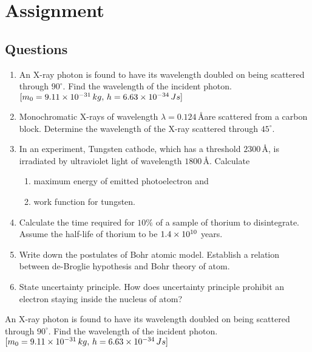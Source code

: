 \documentclass[../main.tex]{subfiles}
\begin{document}
\chapter{Assignment}
\section{Questions}
\begin{enumerate}
    \item An X-ray photon is found to have its wavelength doubled on being scattered through $ 90^\circ $. Find the wavelength of the incident photon. $ [m_0=9.11\times 10^{-31} \,kg,\, h= 6.63\times 10^{-34} \,Js] $
    \item Monochromatic X-rays of wavelength $ \lambda= 0.124\,$\AA are scattered from a carbon block. Determine the wavelength of the X-ray scattered through $ 45^\circ $.
    \item In an experiment, Tungsten cathode, which has a threshold $ 2300\,$\AA, is irradiated by ultraviolet light of wavelength $ 1800 \,$\AA. Calculate
          \begin{enumerate}[label=(\roman*)]
              \item maximum energy of emitted photoelectron and
              \item  work function for tungsten.
          \end{enumerate}
    \item Calculate the time required for $ 10\% $ of a sample of thorium to disintegrate. Assume the half-life of thorium to be $ 1.4\times 10^{10} $ years.
    \item Write down the postulates of Bohr atomic model. Establish a relation between de-Broglie hypothesis and Bohr theory of atom.
    \item State uncertainty principle. How does uncertainty principle prohibit an electron staying inside the nucleus of atom?
\end{enumerate}
\newpage
\begin{prob}
    An X-ray photon is found to have its wavelength doubled on being scattered through $ 90^\circ $. Find the wavelength of the incident photon. $ [m_0=9.11\times 10^{-31} \,kg,\, h= 6.63\times 10^{-34}\, Js] $
\end{prob}
\end{document}
